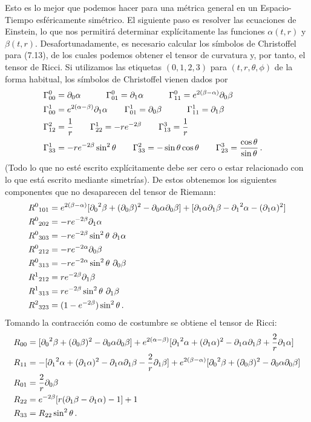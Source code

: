 \documentclass[11pt,b5paper,openany,twoside]{book}
\newcommand{\p}[1]{{\partial_{#1}}}
\begin{document}
Esto es lo mejor que podemos hacer para una métrica general en un Espacio-Tiempo esféricamente simétrico.
El siguiente paso es resolver las ecuaciones de Einstein, lo que nos permitirá determinar explícitamente las funciones $\alpha(t,r)$ y $\beta(t,r)$.
Desafortunadamente, es necesario calcular los símbolos de Christoffel para (7.13), de los cuales podemos obtener el tensor de curvatura y, por tanto, el tensor de Ricci.
Si utilizamos las etiquetas $(0,1,2,3)$ para $(t,r,\theta,\phi)$ de la forma habitual, los símbolos de Christoffel vienen dados por
\begin{align}
&\Gamma^0_{00}=\p0\alpha\qquad\quad
\Gamma^0_{01} = \p1\alpha \qquad\quad
\Gamma^0_{11} = e^{2(\beta-\alpha)}\p0\beta & \notag \\  &
\Gamma^1_{00} = e^{2(\alpha-\beta)}\p1\alpha\qquad
\Gamma^1_{01} = \p0\beta \qquad\quad
\Gamma^1_{11} = \p1\beta &  \notag \\  &
\Gamma^2_{12} = {1\over r}\qquad
\Gamma^1_{22} = - r e^{-2\beta}\qquad
\Gamma^3_{13} = {1\over r} & \notag \\  &
\Gamma^1_{33} = -r e^{-2\beta}\sin^2\theta\qquad
\Gamma^2_{33} = -\sin\theta \cos\theta \qquad
\Gamma^3_{23} = {{\cos\theta}\over {\sin\theta}}\,.&\label{7.14}
\end{align}
(Todo lo que no esté escrito explícitamente debe ser cero o estar relacionado con lo que está escrito mediante simetrías).
De estos obtenemos los siguientes componentes que no desaparecen del tensor de Riemann:
\begin{align}
R^0{}_{101}  &=  e^{2(\beta-\alpha)}[\p0^2\beta +(\p0\beta)^2
-\p0\alpha \p0\beta]+[\p1\alpha\p1\beta-\p1^2\alpha -(\p1\alpha)^2] \notag \\
R^0{}_{202}  &=  -r e^{-2\beta}\p1\alpha  \notag \\
R^0{}_{303}  &=  -r e^{-2\beta}\sin^2\theta\ \p1\alpha  \notag \\
R^0{}_{212}  &=  -r e^{-2\alpha}\p0\beta  \notag \\
R^0{}_{313}  &=  -r e^{-2\alpha}\sin^2\theta\ \p0\beta  \notag \\
R^1{}_{212}  &=  r e^{-2\beta}\p1\beta  \notag \\
R^1{}_{313}  &=  r e^{-2\beta}\sin^2\theta\ \p1\beta  \notag \\
R^2{}_{323}  &=  (1-e^{-2\beta})\sin^2\theta\,.\label{7.15}
\end{align}
Tomando la contracción como de costumbre se obtiene el tensor de Ricci:
\begin{align}
R_{00}  &=  [\p0^2\beta +(\p0\beta)^2-\p0\alpha \p0\beta] +
e^{2(\alpha-\beta)}[\p1^2\alpha +(\p1\alpha)^2-\p1\alpha\p1\beta
+{2\over{r}}\p1\alpha] \notag \\
R_{11}  &=  -[\p1^2\alpha +(\p1\alpha)^2-\p1\alpha\p1\beta
-{2\over{r}}\p1\beta] + e^{2(\beta-\alpha)}[\p0^2\beta +(\p0\beta)^2
-\p0\alpha \p0\beta] \notag \\
R_{01}  &=  {2\over{r}}\p0\beta  \notag \\
R_{22}  &=  e^{-2\beta}[r(\p1\beta-\p1\alpha)-1]+1 \notag \\
R_{33}  &=  R_{22}\sin^2\theta\,.\label{7.16}
\end{align}
\end{document}
